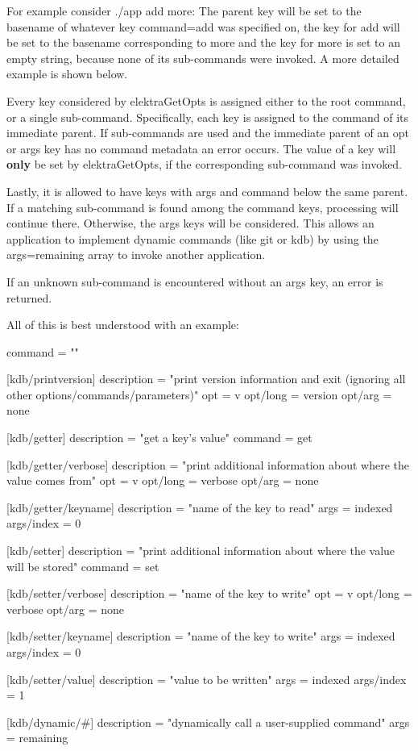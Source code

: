 For example consider {\ttfamily ./app add more}\+: The parent key will be set to the basename of whatever key {\ttfamily command=add} was specified on, the key for {\ttfamily add} will be set to the basename corresponding to {\ttfamily more} and the key for {\ttfamily more} is set to an empty string, because none of its sub-\/commands were invoked. A more detailed example is shown below.

Every key considered by {\ttfamily elektra\+Get\+Opts} is assigned either to the root command, or a single sub-\/command. Specifically, each key is assigned to the command of its immediate parent. If sub-\/commands are used and the immediate parent of an {\ttfamily opt} or {\ttfamily args} key has no {\ttfamily command} metadata an error occurs. The value of a key will {\bfseries only} be set by {\ttfamily elektra\+Get\+Opts}, if the corresponding sub-\/command was invoked.

Lastly, it is allowed to have keys with {\ttfamily args} and {\ttfamily command} below the same parent. If a matching sub-\/command is found among the {\ttfamily command} keys, processing will continue there. Otherwise, the {\ttfamily args} keys will be considered. This allows an application to implement dynamic commands (like {\ttfamily git} or {\ttfamily kdb}) by using the {\ttfamily args=remaining} array to invoke another application.

If an unknown sub-\/command is encountered without an {\ttfamily args} key, an error is returned.

All of this is best understood with an example\+:


\begin{DoxyCode}
[kdb]
command = ""

[kdb/printversion]
description = "print version information and exit (ignoring all other options/commands/parameters)"
opt = v
opt/long = version
opt/arg = none

[kdb/getter]
description = "get a key's value"
command = get

[kdb/getter/verbose]
description = "print additional information about where the value comes from"
opt = v
opt/long = verbose
opt/arg = none

[kdb/getter/keyname]
description = "name of the key to read"
args = indexed
args/index = 0

[kdb/setter]
description = "print additional information about where the value will be stored"
command = set

[kdb/setter/verbose]
description = "name of the key to write"
opt = v
opt/long = verbose
opt/arg = none

[kdb/setter/keyname]
description = "name of the key to write"
args = indexed
args/index = 0

[kdb/setter/value]
description = "value to be written"
args = indexed
args/index = 1

[kdb/dynamic/#]
description = "dynamically call a user-supplied command"
args = remaining
\end{DoxyCode}



